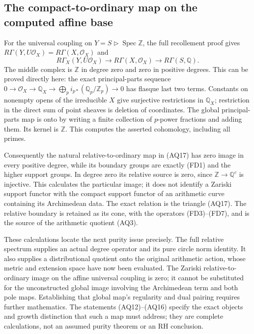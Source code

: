 \subsection{The compact-to-ordinary map on the computed affine base}
For the universal coupling on $Y=S\triangleright\operatorname{Spec}\mathbb Z$,
the full recollement proof gives
$R\Gamma(Y,U\mathcal O_X)=R\Gamma(X,\mathcal O_X)$ and
\[
 R\Gamma_X(Y,U\mathcal O_X)
 \longrightarrow R\Gamma(X,\mathcal O_X)
 \longrightarrow R\Gamma(S,\mathbb Q).
 \tag{AQ17}
\]
The middle complex is $\mathbb Z$ in degree zero and zero in positive
degrees. This can be proved directly here: the exact principal-parts
sequence $0\to\mathcal O_X\to\mathbb Q_X\to
\bigoplus_p i_{p*}(\mathbb Q_p/\mathbb Z_p)\to0$ has flasque
last two terms. Constants on nonempty opens of the irreducible $X$
give surjective restrictions in $\mathbb Q_X$; restriction in the
direct sum of point sheaves is deletion of coordinates. The global
principal-parts map is onto by writing a finite collection of
$p$-power fractions and adding them. Its kernel is $\mathbb Z$.
This computes the asserted cohomology, including all primes.

Consequently the natural relative-to-ordinary map in (AQ17) has
zero image in every positive degree, while its boundary groups are
exactly (FD1) and the higher support groups. In degree zero its
relative source is zero, since $\mathbb Z\to\mathbb Q^c$ is injective.
This calculates the particular image; it does not identify a
Zariski support functor with the compact support functor of an
arithmetic curve containing its Archimedean data. The exact
relation is the triangle (AQ17). The relative boundary is retained
as its cone, with the operators (FD3)--(FD7), and is the source
of the arithmetic quotient (AQ3).

These calculations locate the next purity issue precisely. The full
relative spectrum supplies an actual degree operator and its pure
circle norm identity. It also supplies a distributional quotient onto
the original arithmetic action, whose metric and extension space have
now been evaluated. The Zariski relative-to-ordinary image on the
affine universal coupling is zero; it cannot be substituted for the
unconstructed global image involving the Archimedean term and both
pole maps. Establishing that global map's regularity and dual pairing
requires further mathematics. The statements (AQ12)--(AQ16) specify
the exact objects and growth distinction that such a map must address;
they are complete calculations, not an assumed purity theorem or an RH
conclusion.

